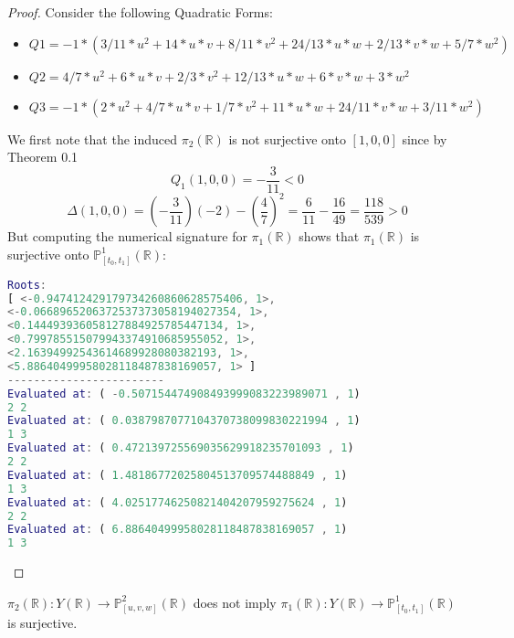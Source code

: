 \documentclass{article}
\newcommand{\Rbb}{\mathbb{R}}
\newcommand{\Pbb}{\mathbb{P}}
\begin{document}
\begin{proof}
Consider the following Quadratic Forms:
\begin{itemize}
    \item $Q1 = -1*(3/11*u^2 + 14*u*v + 8/11*v^2 + 24/13*u*w + 2/13*v*w + 5/7*w^2)$
    \item $Q2 = 4/7*u^2 + 6*u*v + 2/3*v^2 + 12/13*u*w + 6*v*w + 3*w^2$
    \item $Q3 = -1*(2*u^2 + 4/7*u*v + 1/7*v^2 + 11*u*w + 24/11*v*w + 3/11*w^2)$
\end{itemize}
We first note that the induced $\pi_2(\Rbb)$ is not surjective onto $[1, 0, 0]$ since by Theorem 0.1
\[Q_1(1, 0, 0) = -\frac{3}{11} < 0\]
\[\Delta(1, 0, 0) = (-\frac{3}{11})(-2) - (\frac{4}{7})^2 = \frac{6}{11} - \frac{16}{49} = \frac{118}{539} > 0\]
But computing the numerical signature for $\pi_1(\Rbb)$ shows that $\pi_1(\Rbb)$ is surjective onto $\Pbb^{1}_{[t_0, t_1]}(\Rbb)$:
\begin{lstlisting}[language=Matlab, caption=$\pi_2(\mathbb{R})$ is Not Surjective]
Roots:  
[ <-0.947412429179734260860628575406, 1>,
<-0.0668965206372537373058194027354, 1>,
<0.144493936058127884925785447134, 1>,
<0.799785515079943374910685955052, 1>,
<2.16394992543614689928080382193, 1>,
<5.88640499958028118487838169057, 1> ]
------------------------
Evaluated at: ( -0.507154474908493999083223989071 , 1)
2 2
Evaluated at: ( 0.0387987077104370738099830221994 , 1)
1 3
Evaluated at: ( 0.472139725569035629918235701093 , 1)
2 2
Evaluated at: ( 1.48186772025804513709574488849 , 1)
1 3
Evaluated at: ( 4.02517746250821404207959275624 , 1)
2 2
Evaluated at: ( 6.88640499958028118487838169057 , 1)
1 3
\end{lstlisting}
\end{proof}

\begin{proposition}
$\pi_2(\Rbb): Y(\Rbb) \to \Pbb^{2}_{[u, v, w]}(\Rbb)$ does not imply $\pi_1(\Rbb): Y(\Rbb) \to \Pbb^{1}_{[t_0, t_1]}(\Rbb)$ is surjective.
\end{proposition}
\end{document}
